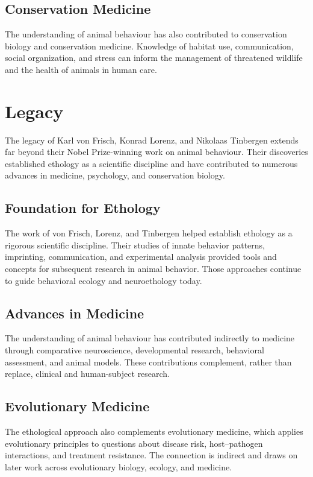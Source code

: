 \subsection{Conservation Medicine}

The understanding of animal behaviour has also contributed to conservation biology and conservation medicine. Knowledge of habitat use, communication, social organization, and stress can inform the management of threatened wildlife and the health of animals in human care.

\section{Legacy}

The legacy of Karl von Frisch, Konrad Lorenz, and Nikolaas Tinbergen extends far beyond their Nobel Prize-winning work on animal behaviour. Their discoveries established ethology as a scientific discipline and have contributed to numerous advances in medicine, psychology, and conservation biology.

\subsection{Foundation for Ethology}

The work of von Frisch, Lorenz, and Tinbergen helped establish ethology as a rigorous scientific discipline. Their studies of innate behavior patterns, imprinting, communication, and experimental analysis provided tools and concepts for subsequent research in animal behavior. Those approaches continue to guide behavioral ecology and neuroethology today.

\subsection{Advances in Medicine}

The understanding of animal behaviour has contributed indirectly to medicine through comparative neuroscience, developmental research, behavioral assessment, and animal models. These contributions complement, rather than replace, clinical and human-subject research.

\subsection{Evolutionary Medicine}

The ethological approach also complements evolutionary medicine, which applies evolutionary principles to questions about disease risk, host--pathogen interactions, and treatment resistance. The connection is indirect and draws on later work across evolutionary biology, ecology, and medicine.

